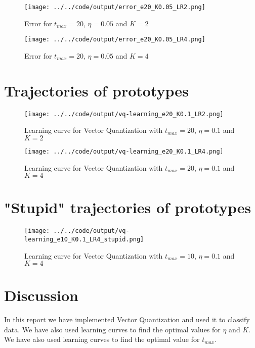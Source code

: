 \documentclass[twoside, a4paper, fleqn, reqno]{article}
\begin{document}
\begin{figure}[H]
	\centering
	\texttt{[image: ../../code/output/error\_e20\_K0.05\_LR2.png]}
	\caption{Error for $t_{max}=20$, $\eta = 0.05$ and $K = 2$}
	\label{fig:error_e20_K0.05_LR2}
\end{figure}

\begin{figure}[H]
	\centering
	\texttt{[image: ../../code/output/error\_e20\_K0.05\_LR4.png]}
	\caption{Error for $t_{max}=20$, $\eta = 0.05$ and $K = 4$}
	\label{fig:error_e20_K0.05_LR4}
\end{figure}

\section{Trajectories of prototypes}

\begin{figure}[H]
	\centering
	\texttt{[image: ../../code/output/vq-learning\_e20\_K0.1\_LR2.png]}
	\caption{Learning curve for Vector Quantization with $t_{max}=20$, $\eta=0.1$ and $K=2$}
	\label{fig:vq-learning_e20_K0.1_LR2}
\end{figure}

\begin{figure}[H]
	\centering
	\texttt{[image: ../../code/output/vq-learning\_e20\_K0.1\_LR4.png]}
	\caption{Learning curve for Vector Quantization with $t_{max}=20$, $\eta=0.1$ and $K=4$}
	\label{fig:vq-learning_e20_K0.1_LR4}
\end{figure}

\section{"Stupid" trajectories of prototypes}

\begin{figure}[H]
	\centering
	\texttt{[image: ../../code/output/vq-learning\_e10\_K0.1\_LR4\_stupid.png]}
	\caption{Learning curve for Vector Quantization with $t_{max}=10$, $\eta=0.1$ and $K=4$}
	\label{fig:vq-learning_e20_K0.1_LR4_stupid}
\end{figure}

\section{Discussion}

In this report we have implemented Vector Quantization and used it to classify data.
We have also used learning curves to find the optimal values for $\eta$ and $K$.
We have also used learning curves to find the optimal value for $t_{max}$.
\end{document}

